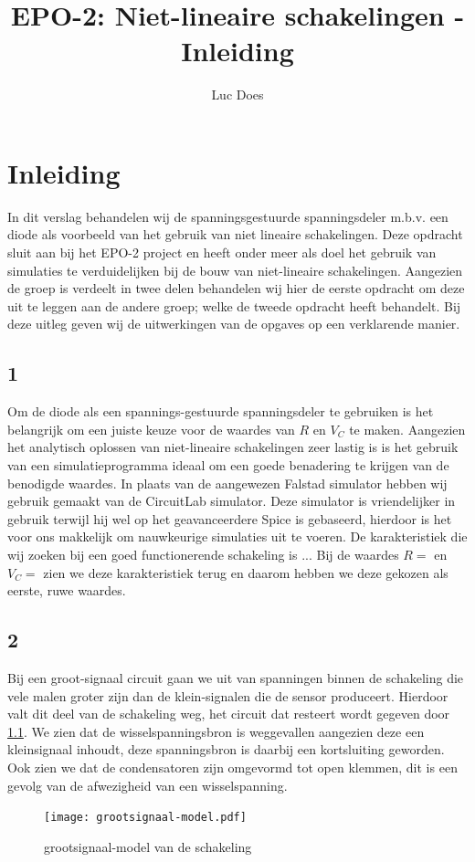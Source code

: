 \documentclass{report}
\title{EPO-2: Niet-lineaire schakelingen - Inleiding}
\author{Luc Does}
\begin{document}
\chapter{Inleiding}
\label{ch:inleiding}

In dit verslag behandelen wij de spanningsgestuurde spanningsdeler m.b.v. een diode als voorbeeld van het gebruik van niet lineaire schakelingen. Deze opdracht sluit aan bij het EPO-2 project en heeft onder meer als doel het gebruik van simulaties te verduidelijken bij de bouw van niet-lineaire schakelingen. \newline
Aangezien de groep is verdeelt in twee delen behandelen wij hier de eerste opdracht om deze uit te leggen aan de andere groep; welke de tweede opdracht heeft behandelt. Bij deze uitleg geven wij de uitwerkingen van de opgaves op een verklarende manier.


\section{1}
Om de diode als een spannings-gestuurde spanningsdeler te gebruiken is het belangrijk om een juiste keuze voor de waardes van $R$ en $V_C$ te maken. Aangezien het analytisch oplossen van niet-lineaire schakelingen zeer lastig is is het gebruik van een simulatieprogramma ideaal om een goede benadering te krijgen van de benodigde waardes. In plaats van de aangewezen Falstad simulator hebben wij gebruik gemaakt van de CircuitLab simulator. Deze simulator is vriendelijker in gebruik terwijl hij wel op het geavanceerdere  Spice is gebaseerd, hierdoor is het voor ons makkelijk om nauwkeurige simulaties uit te voeren.
\newline
De karakteristiek die wij zoeken bij een goed functionerende schakeling is ... Bij de waardes $R = $ en $V_C = $ zien we deze karakteristiek terug en daarom hebben we deze gekozen als eerste, ruwe waardes.

\section{2}
Bij een groot-signaal circuit gaan we uit van spanningen binnen de schakeling die vele malen groter zijn dan de klein-signalen die de sensor produceert. Hierdoor valt dit deel van de schakeling weg, het circuit dat resteert wordt gegeven door \ref{fig:groot}.
We zien dat de wisselspanningsbron is weggevallen aangezien deze een kleinsignaal inhoudt, deze spanningsbron is daarbij een kortsluiting geworden. Ook zien we dat de condensatoren zijn omgevormd tot open klemmen, dit is een gevolg van de afwezigheid van een wisselspanning.
\begin{figure}[H]
	\centering
	\texttt{[image: grootsignaal-model.pdf]}
	\caption{grootsignaal-model van de schakeling}
	\label{fig:groot}
\end{figure}
\end{document}
